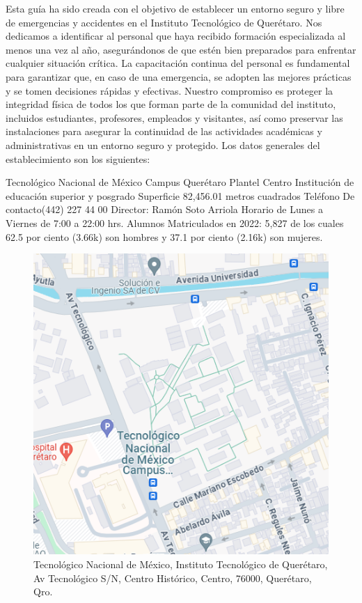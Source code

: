     Esta guía ha sido creada con el objetivo de establecer un entorno seguro y libre de emergencias y accidentes en el Instituto Tecnológico de Querétaro. Nos dedicamos a identificar al personal que haya recibido formación especializada al menos una vez al año, asegurándonos de que estén bien preparados para enfrentar cualquier situación crítica. La capacitación continua del personal es fundamental para garantizar que, en caso de una emergencia, se adopten las mejores prácticas y se tomen decisiones rápidas y efectivas. Nuestro compromiso es proteger la integridad física de todos los que forman parte de la comunidad del instituto, incluidos estudiantes, profesores, empleados y visitantes, así como preservar las instalaciones para asegurar la continuidad de las actividades académicas y administrativas en un entorno seguro y protegido.
    Los datos generales del establecimiento son los siguientes:
    
    Tecnológico Nacional de México Campus Querétaro Plantel Centro
    Institución de educación superior y posgrado
    Superficie 82,456.01 metros cuadrados 
    Teléfono De contacto(442) 227 44 00
    Director: Ramón Soto Arriola
    Horario de Lunes a Viernes de 7:00 a 22:00 hrs.
    Alumnos Matriculados en 2022: 5,827 de los cuales 62.5 por ciento (3.66k) son hombres y 37.1 por ciento (2.16k) son mujeres.
    
    \begin{figure}[H]
        \centering
        \includegraphics[scale=0.4]{35/Img/mapaITQ.png}
        \caption{Tecnológico Nacional de México, Instituto Tecnológico de Querétaro, Av Tecnológico S/N, Centro Histórico, Centro, 76000, Querétaro, Qro.}
        \label{fig:mapaITQ}
    \end{figure}
    
